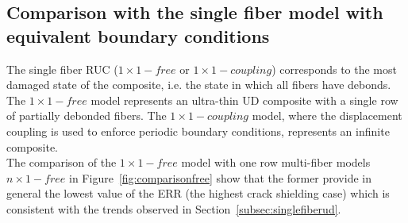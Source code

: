 \documentclass[review]{elsarticle}
\begin{document}
\subsection{Comparison with the single fiber model with equivalent boundary conditions}

The single fiber RUC ($1\times 1-free$ or $1\times 1-coupling$) corresponds to the most damaged state of the composite, i.e. the state in which all fibers have debonds. The $1\times 1-free$ model represents an ultra-thin UD composite with a single row of partially debonded fibers. The $1\times 1-coupling$ model, where the displacement coupling is used to enforce periodic boundary conditions, represents an infinite composite.\\
The comparison of the $1\times 1-free$  model with one row multi-fiber models $n\times 1-free$ in Figure~\ref{fig:comparisonfree} show that the former provide in general the lowest value of the ERR (the highest crack shielding case) which is consistent with the trends observed in Section~\ref{subsec:singlefiberud}.
\end{document}
